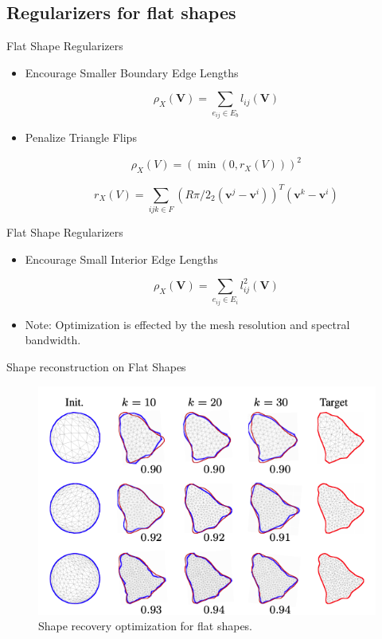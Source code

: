 \documentclass{beamer}
\begin{document}
\subsection{Regularizers for flat shapes}

\begin{frame}{Flat Shape Regularizers}

\begin{itemize}
    \item Encourage Smaller Boundary Edge Lengths
    
    $$ \rho_{X}(\mathbf{V}) = \sum_{e_{ij} \in E_{b}} l_{ij}(\mathbf{V}) $$
    
    \item Penalize Triangle Flips
    
    $$\rho_{X}(V)=\left(\min \left(0, r_{X}(V)\right)\right)^{2}$$
    
   $$r_{X}(V)=\sum_{i j k \in F}\left(R \pi / 2_{2}\left(\mathbf{v}^{j}-\mathbf{v}^{i}\right)\right)^{T}\left(\mathbf{v}^{k}-\mathbf{v}^{i}\right)$$

    
\end{itemize}
    
\end{frame}

\begin{frame}{Flat Shape Regularizers}

\begin{itemize}

    \item Encourage Small Interior Edge Lengths
    
    $$ \rho_{X}(\mathbf{V}) = \sum_{e_{ij} \in E_{i}} l_{ij}^2(\mathbf{V}) $$
    
    \item Note: Optimization is effected by the mesh resolution and spectral bandwidth.
    
\end{itemize}
    
\end{frame}

\begin{frame}{Shape reconstruction on Flat Shapes}

\begin{figure}
 \includegraphics[height=0.5\textwidth,keepaspectratio]{Flatshapes}
 \caption{\label{fig:Flatshapes} Shape recovery optimization for flat shapes.}
\end{figure}
    
\end{frame}
\end{document}

